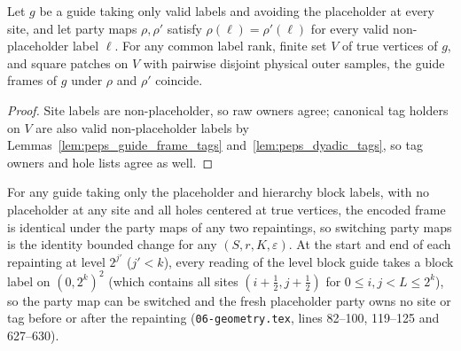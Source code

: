 \begin{lemma}
    \label{thm:peps_guide_frame_owner_agreement}
    \leanok
    Let $g$ be a guide taking only valid labels and avoiding the placeholder at every site, and let party maps $\rho,\rho'$ satisfy $\rho(\ell)=\rho'(\ell)$ for every valid non-placeholder label $\ell$. For any common label rank, finite set $V$ of true vertices of $g$, and square patches on $V$ with pairwise disjoint physical outer samples, the guide frames of $g$ under $\rho$ and $\rho'$ coincide.
\end{lemma}

\begin{proof}\leanok
    Site labels are non-placeholder, so raw owners agree; canonical tag holders on $V$ are also valid non-placeholder labels by Lemmas~\ref{lem:peps_guide_frame_tags} and~\ref{lem:peps_dyadic_tags}, so tag owners and hole lists agree as well.
\end{proof}

\begin{lemma}
    \label{thm:peps_protocol_party_map_switch}
    \leanok
    For any guide taking only the placeholder and hierarchy block labels, with no placeholder at any site and all holes centered at true vertices, the encoded frame is identical under the party maps of any two repaintings, so switching party maps is the identity bounded change for any $(S,r,K,\varepsilon)$. At the start and end of each repainting at level $2^{j'}$ ($j'<k$), every reading of the level block guide takes a block label on $(0,2^k)^2$ (which contains all sites $(i+\frac12,j+\frac12)$ for $0\le i,j<L\le2^k$), so the party map can be switched and the fresh placeholder party owns no site or tag before or after the repainting (\texttt{06-geometry.tex}, lines 82--100, 119--125 and 627--630).
\end{lemma}

